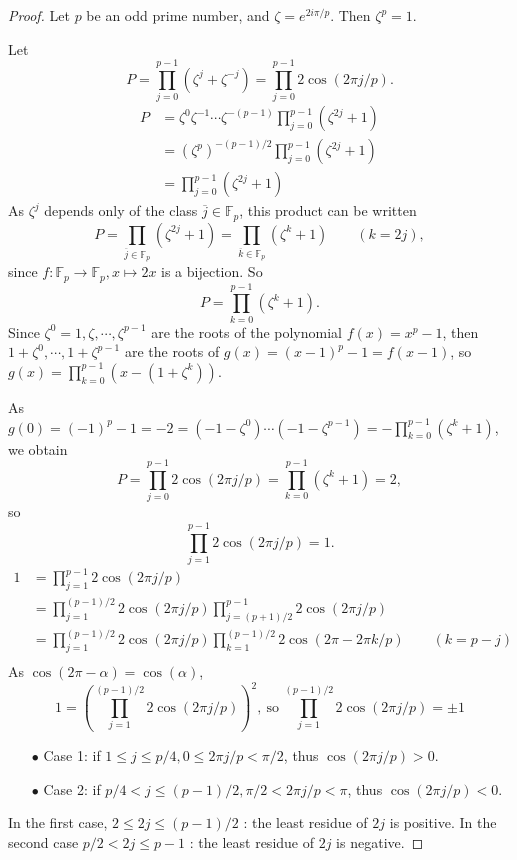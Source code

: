 \documentclass[11pt,a4paper]{article}
\newcommand{\F}{\mathbb{F}}
\begin{document}
\begin{proof}
Let $p$ be an odd prime number, and $\zeta = e^{2i\pi/p}$. Then $\zeta^p = 1$.

Let $$P = \prod_{j=0}^{p-1} (\zeta^j + \zeta^{-j})= \prod_{j=0}^{p-1} 2 \cos(2\pi j/p).$$
\begin{align*}
P &= \zeta^0\zeta^{-1}\cdots\zeta^{-(p-1)} \prod_{j=0}^{p-1} (\zeta^{2j} + 1)\\
&= (\zeta^p)^{-(p-1)/2} \prod_{j=0}^{p-1} (\zeta^{2j} + 1)\\
&= \prod_{j=0}^{p-1} (\zeta^{2j} + 1)
\end{align*}
As $\zeta^j$ depends only of the class $\overline{j} \in \F_p$, this product can be written 
$$P = \prod_{\overline{j }\in \F_p} (\zeta^{2j} + 1) = \prod_{\overline{k} \in \F_p} (\zeta^{k} + 1)\qquad (k=2j), $$
since $f : \F_p \to \F_p, x \mapsto 2x$ is a bijection. So
$$P = \prod_{k=0}^{p-1} (\zeta^{k} + 1).$$
Since $\zeta^0 = 1, \zeta,\cdots, \zeta^{p-1}$ are the roots of the polynomial $f(x) = x^p-1$, then $1+\zeta^0, \cdots,1+\zeta^{p-1}$ are the roots of $g(x) =(x-1)^p - 1 = f(x-1)$, so $g(x) = \prod_{k=0}^{p-1} (x - (1+\zeta^k))$. 

As $g(0) = (-1)^p - 1 = -2 = (-1-\zeta^0)\cdots(-1-\zeta^{p-1}) = -\prod_{k=0}^{p-1} (\zeta^{k} + 1)$, we obtain
$$P = \prod_{j=0}^{p-1} 2 \cos(2\pi j/p) = \prod_{k=0}^{p-1} (\zeta^{k} + 1) = 2,$$
so
$$\prod_{j=1}^{p-1} 2 \cos(2\pi j/p)  = 1.$$
\begin{align*}
1 &= \prod_{j=1}^{p-1} 2 \cos(2\pi j/p)\\
&=\prod_{j=1}^{(p-1)/2} 2 \cos(2\pi j/p) \prod_{j=(p+1)/2}^{p-1} 2 \cos(2\pi j/p)\\
&= \prod_{j=1}^{(p-1)/2} 2 \cos(2\pi j/p)  \prod_{k = 1}^{(p-1)/2} 2 \cos(2\pi - 2\pi k/p) \qquad (k = p-j) \\
\end{align*}
As $\cos(2\pi - \alpha) = \cos(\alpha)$, 
$$1 = \left ( \prod_{j=1}^{(p-1)/2} 2 \cos(2\pi j/p)  \right)^2, \ \mathrm{so} \ \prod_{j=1}^{(p-1)/2} 2 \cos(2\pi j/p) = \pm 1$$

\begin{enumerate}
\item[$\bullet$] Case 1: if $1\leq j \leq p/4, 0 \leq 2\pi j/p <\pi/2$, thus $\cos (2\pi j/p)>0$.

\item[$\bullet$] Case 2: if $p/4<j\leq (p-1)/2, \pi/2 < 2\pi j/p < \pi$, thus $\cos (2\pi j/p)<0$.
\end{enumerate}
In the first case, $2 \leq 2j \leq (p-1)/2$ : the least residue of $2j$ is positive. In the second case $ p/2< 2j \leq p-1$ : the least residue of $2j$ is negative.


\end{proof}
\end{document}
